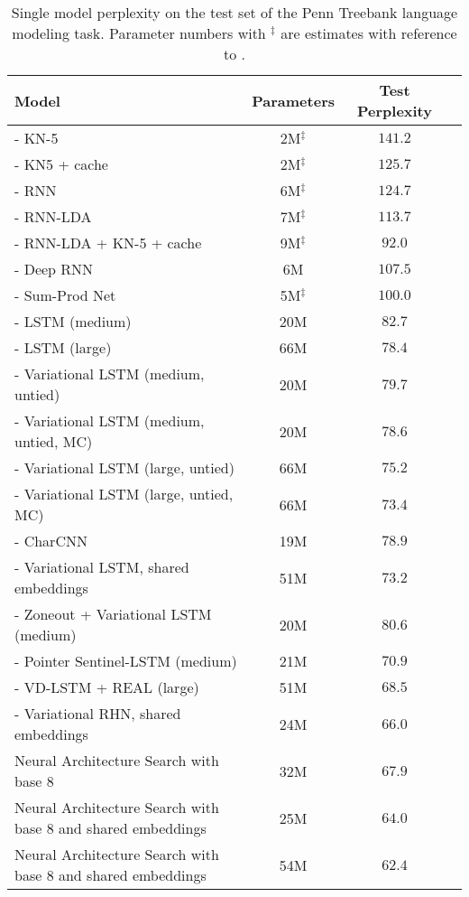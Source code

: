 \documentclass{article} \usepackage{iclr2017_conference,times}
\begin{document}
\begin{table*}[h!]
\center
\begin{small}
\begin{tabular}{l|ccc}
\toprule
\bf Model & \bf Parameters &  \bf Test Perplexity\\
\midrule
\citet{Mikolov2012} - KN-5 & 2M$^\ddagger$ & $141.2$ \\
\citet{Mikolov2012} - KN5 + cache & 2M$^\ddagger$ & $125.7$ \\
\citet{Mikolov2012} - RNN & 6M$^\ddagger$ & $124.7$ \\
\citet{Mikolov2012} - RNN-LDA & 7M$^\ddagger$ & $113.7$ \\
\citet{Mikolov2012} - RNN-LDA + KN-5 + cache & 9M$^\ddagger$  & $92.0$ \\
\citet{Pascanu2013a} - Deep RNN & 6M & $107.5$ \\
\citet{Cheng2014} - Sum-Prod Net & 5M$^\ddagger$ & $100.0$ \\
\citet{ZarembaReg} - LSTM (medium) & 20M & $82.7$ \\
\citet{ZarembaReg} - LSTM (large) & 66M & $78.4$ \\
\citet{Gal2015} - Variational LSTM (medium, untied) & 20M & $79.7$ \\
\citet{Gal2015} - Variational LSTM (medium, untied, MC) & 20M & $78.6$ \\
\citet{Gal2015} - Variational LSTM (large, untied) & 66M  & $75.2$ \\
\citet{Gal2015} - Variational LSTM (large, untied, MC) & 66M & $73.4$ \\
\citet{Kim2016} - CharCNN & 19M & $78.9$ \\
\citet{shareEmbedding} - Variational LSTM, shared embeddings& 51M & $73.2$ \\
\citet{Socher2016} - Zoneout + Variational LSTM (medium) & 20M & $80.6$ \\
\citet{Socher2016} - Pointer Sentinel-LSTM (medium) & 21M & $70.9$ \\
\citet{SocherEmbedding} - VD-LSTM + REAL (large) & 51M & $68.5$ \\
\citet{Zilly2016} - Variational RHN, shared embeddings & 24M & $66.0$ \\
\midrule
Neural Architecture Search with base 8 & 32M & $67.9$ \\
Neural Architecture Search with base 8 and shared embeddings & 25M & $64.0$ \\
Neural Architecture Search with base 8 and shared embeddings & 54M & $62.4$ \\
\bottomrule
\end{tabular}
\caption{Single model perplexity on the test set of the Penn Treebank language modeling task. Parameter numbers with $^\ddagger$ are estimates with reference to \citet{Socher2016}.}
\label{table:PTBwordresults}
\end{small}
\end{table*}
\end{document}
